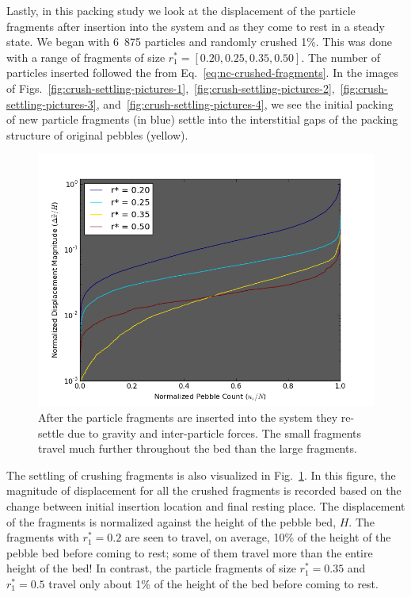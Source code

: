 Lastly, in this packing study we look at the displacement of the particle fragments after insertion into the system and as they come to rest in a steady state. We began with 6~875 particles and randomly crushed 1\%. This was done with a range of fragments of size $r_1^* = [0.20, 0.25, 0.35, 0.50]$. The number of particles inserted followed the from Eq.~\ref{eq:nc-crushed-fragments}. In the images of Figs.~\ref{fig:crush-settling-pictures-1},~\ref{fig:crush-settling-pictures-2},~\ref{fig:crush-settling-pictures-3}, and~\ref{fig:crush-settling-pictures-4}, we see the initial packing of new particle fragments (in blue) settle into the interstitial gaps of the packing structure of original pebbles (yellow).

\begin{figure}[!t]
\centering
    \includegraphics[width=\singleimagewidth]{chapters/figures/crush-fragments/displacement-scatter-radius-ratios.png}
    \caption{After the particle fragments are inserted into the system they re-settle due to gravity and inter-particle forces. The small fragments travel much further throughout the bed than the large fragments.}
    \label{fig:displacement-scatter}
\end{figure}

The settling of crushing fragments is also visualized in Fig.~\ref{fig:displacement-scatter}. In this figure, the magnitude of displacement for all the crushed fragments is recorded based on the change between initial insertion location and final resting place. The displacement of the fragments is normalized against the height of the pebble bed, $H$. The fragments with $r_1^* = 0.2$ are seen to travel, on average, 10\% of the height of the pebble bed before coming to rest; some of them travel more than the entire height of the bed! In contrast, the particle fragments of size $r_1^* = 0.35$ and $r_1^* = 0.5$ travel only about 1\% of the height of the bed before coming to rest. 

